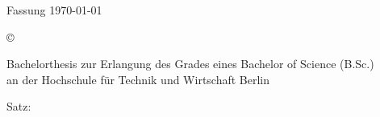 %
Fassung \today
\mbox{}\vfill
\footnotesize{%
	© \the\year{} \theauthor\par
	Bachelorthesis zur Erlangung des Grades eines Bachelor of Science (B.Sc.)\\%
	an der Hochschule für Technik und Wirtschaft Berlin\par
	Satz: \XeLaTeX \the\eTeXversion\eTeXrevision
}
\restoregeometry
\normalsize
\clearpage
